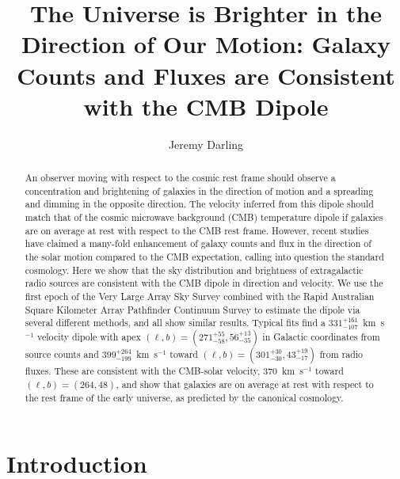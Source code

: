 \documentclass[twocolumn]{aastex63}
\begin{document}

\title{The Universe is Brighter in the Direction of Our Motion:  Galaxy Counts and Fluxes are Consistent with the CMB Dipole}

\author{Jeremy Darling}

 


 \begin{abstract}
   An observer moving with respect to the cosmic rest frame should observe a concentration and brightening
   of galaxies in the direction of motion and a spreading and dimming in the opposite direction.  The velocity inferred
   from this dipole should match that of the cosmic microwave background (CMB)
   temperature dipole if galaxies are on average at rest with respect to the CMB rest frame.  However, recent
   studies have claimed a many-fold enhancement of galaxy counts and flux in the direction of the
   solar motion compared to the CMB expectation, calling into question the standard cosmology.
   Here we show that the sky distribution and brightness of extragalactic radio sources are
   consistent with the CMB dipole in direction and velocity.  We use the first epoch
   of the Very Large Array Sky Survey combined with the Rapid Australian Square Kilometer Array Pathfinder
   Continuum Survey to estimate the dipole via several different methods, and all show similar results.
   Typical fits find a $331^{+161}_{-107}$~km~s$^{-1}$ velocity dipole with apex
   $(\ell,b) = (271^{+55}_{-58}, 56^{+13}_{-35})$ in Galactic coordinates from source counts and
   $399^{+264}_{-199}$~km~s$^{-1}$ toward $(\ell,b) = (301^{+30}_{-30}, 43^{+19}_{-17})$
   from radio fluxes.  These are consistent with the CMB-solar velocity, 370~km~s$^{-1}$ toward
   $(\ell,b) = (264, 48)$, and show
   that galaxies are on average at rest with respect to the rest frame of the early universe,
   as predicted by the canonical cosmology.  
\end{abstract}

  
\section{\label{sec:intro}Introduction}
\end{document}
